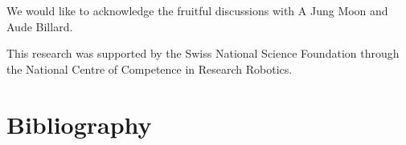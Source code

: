 \documentclass{frontiersSCNS} %
\begin{document}
We would like to acknowledge the fruitful discussions with A Jung Moon and
Aude Billard.

This research was supported by the Swiss National Science Foundation through
the National Centre of Competence in Research Robotics.

\vspace{2cm}
\section*{Bibliography}

\end{document}
